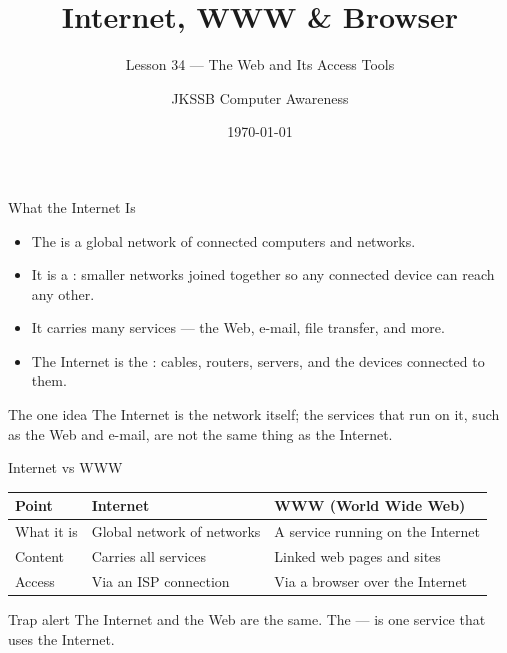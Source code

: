 \documentclass[aspectratio=169]{beamer}
\title{Internet, WWW \& Browser}
\subtitle{Lesson 34 --- The Web and Its Access Tools}
\author{JKSSB Computer Awareness}
\date{\today}
\begin{document}
\frame{\titlepage}

\begin{frame}{What the Internet Is}
  \begin{itemize}
    \item The  is a global network of connected computers and
      networks.
    \item It is a : smaller networks joined together
      so any connected device can reach any other.
    \item It carries many services --- the Web, e-mail, file transfer, and
      more.
    \item The Internet is the : cables, routers,
      servers, and the devices connected to them.
  \end{itemize}
  \begin{block}{The one idea}
    The Internet is the network itself; the services that run on it, such as
    the Web and e-mail, are not the same thing as the Internet.
  \end{block}
\end{frame}

\begin{frame}{Internet vs WWW}
  \begin{center}
    \begin{tabular}{lll}
      \toprule
      \textbf{Point} & \textbf{Internet} & \textbf{WWW (World Wide Web)} \\
      \midrule
      What it is & Global network of networks & A service running on the Internet \\
      Content & Carries all services & Linked web pages and sites \\
      Access & Via an ISP connection & Via a browser over the Internet \\
      \bottomrule
    \end{tabular}
  \end{center}
  \vspace{0.35cm}
  \begin{alertblock}{Trap alert}
    The Internet and the Web are  the same. The  --- is one service that uses the Internet.
  \end{alertblock}
\end{frame}
\end{document}
